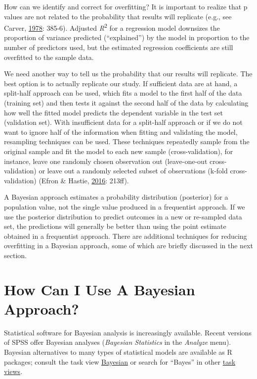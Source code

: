 \documentclass[
  english,
  doc]{apa6}
\begin{document}
How can we identify and correct for overfitting? It is important to realize that p values are not related to the probability that results will replicate (e.g., see Carver, \protect\hyperlink{ref-carverCaseStatisticalSignificance1978}{1978}: 385-6). Adjusted \emph{R}\textsuperscript{2} for a regression model downsizes the proportion of variance predicted (``explained'') by the model in proportion to the number of predictors used, but the estimated regression coefficients are still overfitted to the sample data.

We need another way to tell us the probability that our results will replicate. The best option is to actually replicate our study. If sufficient data are at hand, a split-half approach can be used, which fits a model to the first half of the data (training set) and then tests it against the second half of the data by calculating how well the fitted model predicts the dependent variable in the test set (validation set). With insufficient data for a split-half approach or if we do not want to ignore half of the information when fitting and validating the model, resampling techniques can be used. These techniques repeatedly sample from the original sample and fit the model to each new sample (cross-validation), for instance, leave one randomly chosen observation out (leave-one-out cross-validation) or leave out a randomly selected subset of observations (k-fold cross-validation) (Efron \& Hastie, \protect\hyperlink{ref-efronComputerAgeStatistical2016}{2016}: 213ff).

A Bayesian approach estimates a probability distribution (posterior) for a population value, not the single value produced in a frequentist approach. If we use the posterior distribution to predict outcomes in a new or re-sampled data set, the predictions will generally be better than using the point estimate obtained in a frequentist approach. There are additional techniques for reducing overfitting in a Bayesian approach, some of which are briefly discussed in the next section.

\hypertarget{usebayesian}{%
\section{How Can I Use A Bayesian Approach?}\label{usebayesian}}

Statistical software for Bayesian analysis is increasingly available. Recent versions of SPSS offer Bayesian analyses (\emph{Bayesian Statistics} in the \emph{Analyze} menu). Bayesian alternatives to many types of statistical models are available as R packages; consult the task view \href{https://cran.r-project.org/web/views/Bayesian.html}{Bayesian} or search for ``Bayes'' in other \href{https://cran.r-project.org/web/views/}{task views}.
\end{document}
